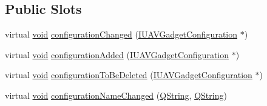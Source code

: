 \subsection*{Public Slots}
\begin{DoxyCompactItemize}
\item 
virtual \hyperlink{group___u_a_v_objects_plugin_ga444cf2ff3f0ecbe028adce838d373f5c}{void} \hyperlink{group___core_plugin_ga4a76f276d67023d53ca8a5338af10634}{configuration\-Changed} (\hyperlink{class_core_1_1_i_u_a_v_gadget_configuration}{I\-U\-A\-V\-Gadget\-Configuration} $\ast$)
\item 
virtual \hyperlink{group___u_a_v_objects_plugin_ga444cf2ff3f0ecbe028adce838d373f5c}{void} \hyperlink{group___core_plugin_ga8234e97e94558cdd2ee137db82925693}{configuration\-Added} (\hyperlink{class_core_1_1_i_u_a_v_gadget_configuration}{I\-U\-A\-V\-Gadget\-Configuration} $\ast$)
\item 
virtual \hyperlink{group___u_a_v_objects_plugin_ga444cf2ff3f0ecbe028adce838d373f5c}{void} \hyperlink{group___core_plugin_ga7810dea18c37e2ec2588adfed05701f0}{configuration\-To\-Be\-Deleted} (\hyperlink{class_core_1_1_i_u_a_v_gadget_configuration}{I\-U\-A\-V\-Gadget\-Configuration} $\ast$)
\item 
virtual \hyperlink{group___u_a_v_objects_plugin_ga444cf2ff3f0ecbe028adce838d373f5c}{void} \hyperlink{group___core_plugin_ga9fa66647624ca42689597cac1716be5a}{configuration\-Name\-Changed} (\hyperlink{group___u_a_v_objects_plugin_gab9d252f49c333c94a72f97ce3105a32d}{Q\-String}, \hyperlink{group___u_a_v_objects_plugin_gab9d252f49c333c94a72f97ce3105a32d}{Q\-String})
\end{DoxyCompactItemize}
